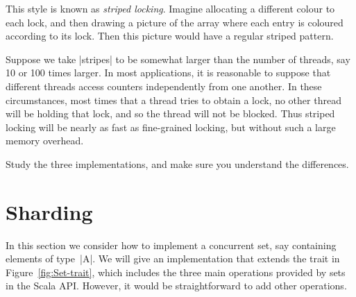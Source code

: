 






This style is known as \emph{striped locking}.  Imagine
allocating a different colour to each lock, and then drawing a picture of the
array where each entry is coloured according to its lock.  Then this picture
would have a regular striped pattern.

Suppose we take |stripes| to be somewhat larger than the number of threads,
say 10 or 100 times larger.  In most applications, it is reasonable to suppose
that different threads access counters independently from one another.  In
these circumstances, most times that a thread tries to obtain a lock, no other
thread will be holding that lock, and so the thread will not be blocked.  Thus
striped locking will be nearly as fast as fine-grained locking, but without
such a large memory overhead.  

\begin{instruction}
Study the three implementations, and make sure you understand the differences.
\end{instruction}


\section{Sharding}
\label{sec:sharding}

In this section we  consider how to implement a concurrent set, say
containing elements of type~|A|.  We will give an implementation that extends
the trait in Figure~\ref{fig:Set-trait}, which includes the three main
operations provided by sets in the Scala API{}\@.  However, it would be
straightforward to add other operations.

